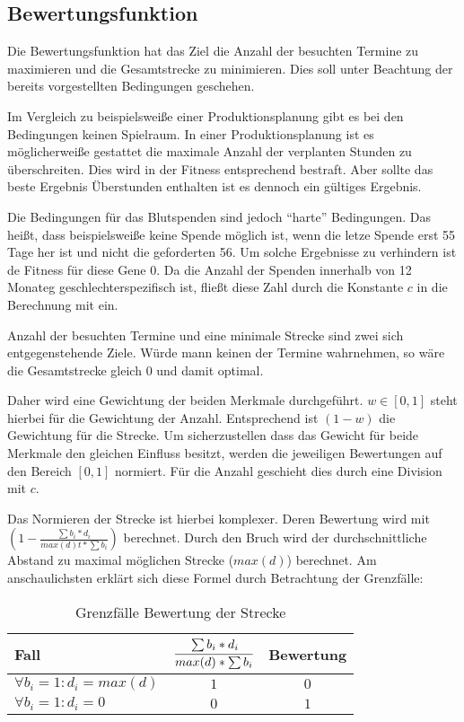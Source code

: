 \subsection{Bewertungsfunktion}
Die Bewertungsfunktion hat das Ziel die Anzahl der besuchten Termine zu maximieren und die Gesamtstrecke zu minimieren.
Dies soll unter Beachtung der bereits vorgestellten Bedingungen geschehen.

Im Vergleich zu beispielsweiße einer Produktionsplanung gibt es bei den Bedingungen keinen Spielraum.
In einer Produktionsplanung ist es möglicherweiße gestattet die maximale Anzahl der verplanten Stunden zu überschreiten.
Dies wird in der Fitness entsprechend bestraft. Aber sollte das beste Ergebnis Überstunden enthalten ist es dennoch ein gültiges Ergebnis.

Die Bedingungen für das Blutspenden sind jedoch \enquote{harte} Bedingungen.
Das heißt, dass beispielsweiße keine Spende möglich ist, wenn die letze Spende erst 55 Tage her ist und nicht die geforderten 56.
Um solche Ergebnisse zu verhindern ist de Fitness für diese Gene $0$.
Da die Anzahl der Spenden innerhalb von 12 Monateg geschlechterspezifisch ist,
fließt diese Zahl durch die Konstante $c$ in die Berechnung mit ein.

Anzahl der besuchten Termine und eine minimale Strecke sind zwei sich entgegenstehende Ziele.
Würde mann keinen der Termine wahrnehmen, so wäre die Gesamtstrecke gleich $0$ und damit optimal.

Daher wird eine Gewichtung der beiden Merkmale durchgeführt.
$w \in [0,1]$ steht hierbei für die Gewichtung der Anzahl.
Entsprechend ist $(1-w)$ die Gewichtung für die Strecke.
Um sicherzustellen dass das Gewicht für beide Merkmale den gleichen Einfluss besitzt,
werden die jeweiligen Bewertungen auf den Bereich $[0,1]$ normiert.
Für die Anzahl geschieht dies durch eine Division mit $c$.

Das Normieren der Strecke ist hierbei komplexer.
Deren Bewertung wird mit $(1 - \frac{\sum b_i * d_i}{max(d)t* \sum b_i})$ berechnet.
Durch den Bruch wird der durchschnittliche Abstand zu maximal möglichen Strecke ($max(d)$) berechnet.
Am anschaulichsten erklärt sich diese Formel durch Betrachtung der Grenzfälle:
\begin{table}[ht]%
    \begin{center}
        \begin{tabular}{l|c|c}
            Fall                            & $\cfrac{\sum b_i * d_i}{max(d) * \sum b_i}$  &  Bewertung \\
            \hline
            $\forall b_i = 1: d_i = max(d)$ & $1$                                           & $0$       \\
            $\forall b_i = 1: d_i = 0$      & $0$                                           & $1$       \\
        \end{tabular}
    \end{center}
    \caption{Grenzfälle Bewertung der Strecke}
  \end{table}


